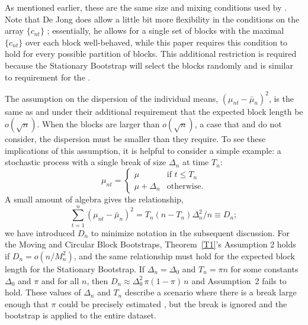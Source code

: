 \documentclass[11pt]{article}
\begin{document}
As mentioned earlier, these are the same size and mixing conditions
used by \citet{Jon:97}.
Note that De Jong does allow a little bit more flexibility in the
conditions on the array $\{c_{nt}\}$ \citep[see also][]{Dav:93};
essentially, he allows for a single set of blocks with the
maximal $\{c_{nt}\}$ over each block well-behaved, while this
paper requires this condition to hold for every possible partition of
blocks.  This additional restriction is required because the
Stationary Bootstrap will select the blocks randomly and is similar to
 requirement for the \fclt.

The assumption on the dispersion of the individual means,
$(\mu_{nt} - \bar\mu_n)^2$, is the same as  and
 under their additional requirement that the
expected block length be $o(\sqrt{n})$. When
the blocks are larger than $o(\sqrt{n})$, a case that \citet{GoW:02}
and \citet{GoJ:03} do not consider, the dispersion must be smaller
than they require.
To see these implications of this assumption, it is helpful to
consider a simple example: a stochastic process with a single break of
size $\Delta_n$ at time $T_n$:
\begin{equation*}
\mu_{nt} =
\begin{cases}
  \mu & \text{if } t \leq T_n \\
  \mu + \Delta_n & \text{otherwise}.
\end{cases}
\end{equation*}
A small amount of algebra gives the relationship,
\begin{equation*}
  \sum_{t=1}^n (\mu_{nt} - \bar \mu_n)^2
  = T_n (n - T_n) \Delta_n^2 / n \equiv D_n;
\end{equation*}
we have introduced $D_n$ to minimize notation in the subsequent
discussion.  For the Moving and Circular Block Bootstraps,
Theorem~\ref{T1}'s Assumption 2 holds if $D_n = o(n / M_n^2)$, and
the same relationship must hold for the expected block length for the
Stationary Bootstrap. If $\Delta_n = \Delta_0$ and $T_n = \pi n$ for
some constants $\Delta_0$ and $\pi$ and for all $n$, then
$D_n \approx \Delta_0^2 \, \pi (1 - \pi) \, n$ and Assumption~2 fails to
hold. These values of $\Delta_n$ and $T_n$ describe a scenario where
there is a break large enough that $\pi$ could be precisely
estimated \citep[as in][]{Bai:94}, but the break is ignored and the
bootstrap is applied to the entire dataset.
\end{document}
